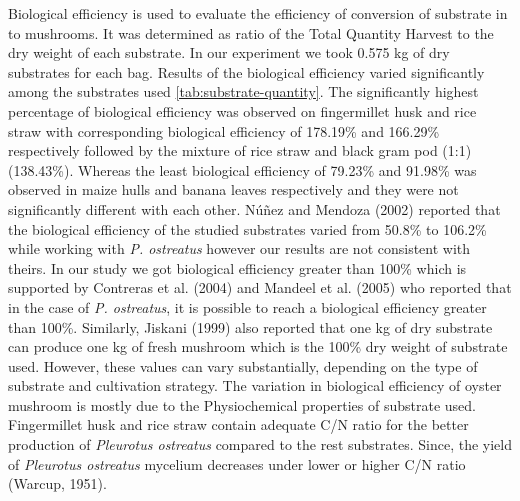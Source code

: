 \documentclass[]{elsarticle} %
\begin{document}
Biological efficiency is used to evaluate the efficiency of conversion
of substrate in to mushrooms. It was determined as ratio of the Total
Quantity Harvest to the dry weight of each substrate. In our experiment
we took 0.575 kg of dry substrates for each bag. Results of the
biological efficiency varied significantly among the substrates used
\ref{tab:substrate-quantity}. The significantly highest percentage of
biological efficiency was observed on fingermillet husk and rice straw
with corresponding biological efficiency of 178.19\% and 166.29\%
respectively followed by the mixture of rice straw and black gram pod
(1:1) (138.43\%). Whereas the least biological efficiency of 79.23\% and
91.98\% was observed in maize hulls and banana leaves respectively and
they were not significantly different with each other. Núñez and Mendoza
(2002) reported that the biological efficiency of the studied substrates
varied from 50.8\% to 106.2\% while working with \textit{P. ostreatus}
however our results are not consistent with theirs. In our study we got
biological efficiency greater than 100\% which is supported by Contreras
et al. (2004) and Mandeel et al. (2005) who reported that in the case of
\textit{P. ostreatus}, it is possible to reach a biological efficiency
greater than 100\%. Similarly, Jiskani (1999) also reported that one kg
of dry substrate can produce one kg of fresh mushroom which is the 100\%
dry weight of substrate used. However, these values can vary
substantially, depending on the type of substrate and cultivation
strategy. The variation in biological efficiency of oyster mushroom is
mostly due to the Physiochemical properties of substrate used.
Fingermillet husk and rice straw contain adequate C/N ratio for the
better production of \textit{Pleurotus ostreatus} compared to the rest
substrates. Since, the yield of \textit{Pleurotus ostreatus} mycelium
decreases under lower or higher C/N ratio (Warcup, 1951).
\end{document}
